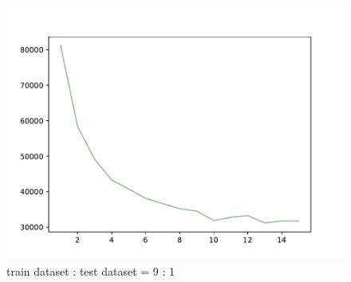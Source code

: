 \documentclass{article}
\begin{document}
\begin{figure}[!h]
{\begin{minipage}{0.21\linewidth}
\centering
  \includegraphics[scale=0.23]{imgs/test_loss_1.pdf}
  \end{minipage}
}
\quad
{}
\caption{ train dataset : test dataset = 9 : 1}
\label{tv0.1}
\end{figure}
\end{document}
